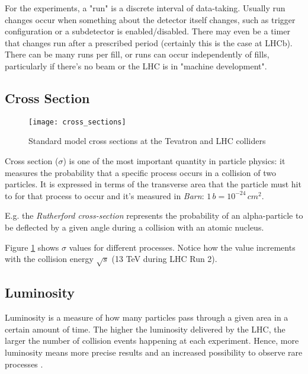 For the experiments, a "run" is a discrete interval of data-taking. Usually run changes occur when something about the detector itself changes, such as trigger configuration or a subdetector is enabled/disabled. There may even be a timer that changes run after a prescribed period (certainly this is the case at LHCb). There can be many runs per fill, or runs can occur independently of fills, particularly if there's no beam or the LHC is in "machine development".

\subsection{Cross Section}

\begin{figure}

	\centerline{
		\texttt{[image: cross\_sections]}}
	\caption{Standard  model  cross  sections  at  the  Tevatron  and  LHC  colliders\cite{Bechtel:2009zza}}
	\label{fig:cross_sections}
\end{figure}

Cross section ($\sigma$) is one of the most important quantity in particle physics: it measures the probability that a specific process occurs in a collision of two particles. It is expressed in terms of the transverse area that the particle must hit to for that process to occur and it's measured in \textit{Barn}: $1\, b = 10^{-24} \,cm^2$.

E.g. the \textit{Rutherford cross-section} represents the probability of an alpha-particle to be deflected by a given angle during a collision with an atomic nucleus.


Figure \ref{fig:cross_sections} shows $\sigma$ values for different processes. Notice how the value increments with the collision energy $\sqrt s$ (13 TeV during LHC Run 2).

\subsection{Luminosity}

Luminosity is a measure of how many particles pass through a given area in a certain amount of time. The higher the luminosity delivered by the LHC, the larger the number of collision events happening at each experiment. Hence, more luminosity means more precise results and an increased possibility to observe rare processes \cite{CERNGlossary}.

